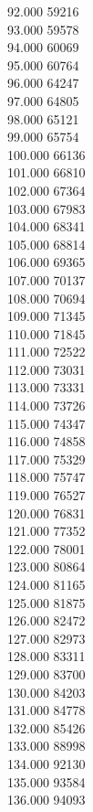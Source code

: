 { 92.000	59216 \\
 93.000	59578 \\
 94.000	60069 \\
 95.000	60764 \\
 96.000	64247 \\
 97.000	64805 \\
 98.000	65121 \\
 99.000	65754 \\
 100.000	66136 \\
 101.000	66810 \\
 102.000	67364 \\
 103.000	67983 \\
 104.000	68341 \\
 105.000	68814 \\
 106.000	69365 \\
 107.000	70137 \\
 108.000	70694 \\
 109.000	71345 \\
 110.000	71845 \\
 111.000	72522 \\
 112.000	73031 \\
 113.000	73331 \\
 114.000	73726 \\
 115.000	74347 \\
 116.000	74858 \\
 117.000	75329 \\
 118.000	75747 \\
 119.000	76527 \\
 120.000	76831 \\
 121.000	77352 \\
 122.000	78001 \\
 123.000	80864 \\
 124.000	81165 \\
 125.000	81875 \\
 126.000	82472 \\
 127.000	82973 \\
 128.000	83311 \\
 129.000	83700 \\
 130.000	84203 \\
 131.000	84778 \\
 132.000	85426 \\
 133.000	88998 \\
 134.000	92130 \\
 135.000	93584 \\
 136.000	94093 \\
}
